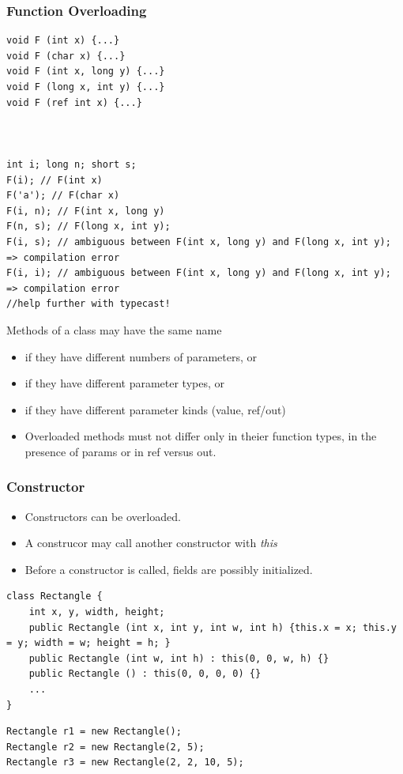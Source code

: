 \subsubsection{Function Overloading}
\begin{multicols}{2}
\begin{lstlisting}
void F (int x) {...}
void F (char x) {...}
void F (int x, long y) {...}
void F (long x, int y) {...}
void F (ref int x) {...}



int i; long n; short s;
F(i); // F(int x)
F('a'); // F(char x)
F(i, n); // F(int x, long y)
F(n, s); // F(long x, int y);
F(i, s); // ambiguous between F(int x, long y) and F(long x, int y); => compilation error
F(i, i); // ambiguous between F(int x, long y) and F(long x, int y); => compilation error
//help further with typecast!
\end{lstlisting}
	\columnbreak
	Methods of a class may have the same name
	\begin{itemize}
		\item if they have different numbers of parameters, or
		\item if they have different parameter types, or
		\item if they have different parameter kinds (value, ref/out)
		\item Overloaded methods must not differ only in theier function types, in the presence of params
		      or in ref versus out.
	\end{itemize}
\end{multicols}

\subsubsection{Constructor}
\begin{itemize}
	\item Constructors can be overloaded.
	\item A construcor may call another constructor with \textit{this}
	\item Before a constructor is called, fields are possibly initialized.
\end{itemize}

\begin{multicols}{2}
\begin{lstlisting}
class Rectangle {
	int x, y, width, height;
	public Rectangle (int x, int y, int w, int h) {this.x = x; this.y = y; width = w; height = h; }
	public Rectangle (int w, int h) : this(0, 0, w, h) {}
	public Rectangle () : this(0, 0, 0, 0) {}
	...
}
\end{lstlisting}
\columnbreak
\begin{lstlisting}
Rectangle r1 = new Rectangle();
Rectangle r2 = new Rectangle(2, 5);
Rectangle r3 = new Rectangle(2, 2, 10, 5);
\end{lstlisting}
\end{multicols}

